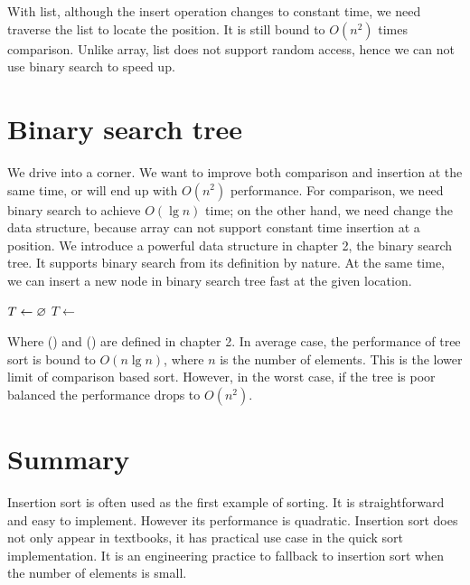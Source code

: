 \documentclass[b5paper]{article}
\begin{document}
With list, although the insert operation changes to constant time, we need traverse the list to locate the position. It is still bound to $O(n^2)$ times comparison. Unlike array, list does not support random access, hence we can not use binary search to speed up.

\begin{Exercise}
\end{Exercise}

\section{Binary search tree}

We drive into a corner. We want to improve both comparison and insertion at the same time, or will end up with $O(n^2)$ performance. For comparison, we need binary search to achieve $O(\lg n)$ time; on the other hand, we need change the data structure, because array can not support constant time insertion at a position. We introduce a powerful data structure in chapter 2, the binary search tree. It supports binary search from its definition by nature. At the same time, we can insert a new node in binary search tree fast at the given location.

\begin{algorithmic}
  \State $T \gets \varnothing$
    \State $T \gets $ 
  \EndFor
  \State \Return {}
\EndFunction
\end{algorithmic}

Where () and () are defined in chapter 2. In average case, the performance of tree sort is bound to $O(n \lg n)$, where $n$ is the number of elements. This is the lower limit of comparison based sort\cite{Knuth}. However, in the worst case, if the tree is poor balanced the performance drops to $O(n^2)$.

\section{Summary}
Insertion sort is often used as the first example of sorting. It is straightforward and easy to implement. However its performance is quadratic. Insertion sort does not only appear in textbooks, it has practical use case in the quick sort implementation. It is an engineering practice to fallback to insertion sort when the number of elements is small.
\end{document}
